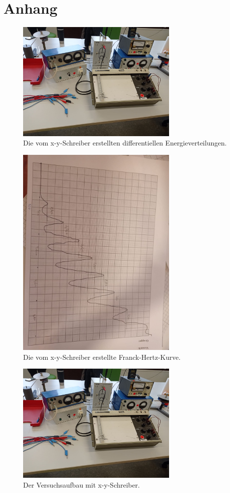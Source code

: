 \newpage
\section{Anhang}

\begin{figure}[h]
  \centering
  \includegraphics[width=0.7\textwidth]{latex/images/aufbau.jpeg}
  \caption{Die vom x-y-Schreiber erstellten differentiellen Energieverteilungen.}
  \label{img:mess1}
\end{figure}

\begin{figure}[h]
  \centering
  \includegraphics[width=0.7\textwidth]{latex/images/hertz.jpeg}
  \caption{Die vom x-y-Schreiber erstellte Franck-Hertz-Kurve.}
  \label{img:mess2}
\end{figure}

    \begin{figure}[h]
        \centering
        \includegraphics[width=0.7\textwidth]{latex/images/aufbau.jpeg}
        \caption{Der Versuchsaufbau mit x-y-Schreiber.}
    \end{figure}


